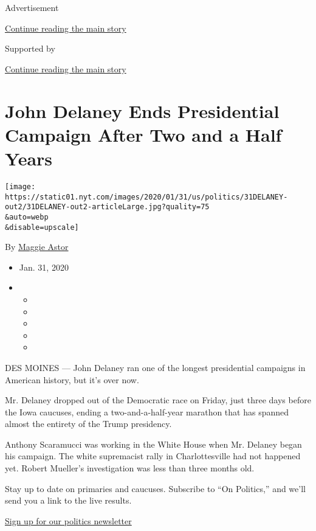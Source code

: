 Advertisement

\protect\hyperlink{after-top}{Continue reading the main story}

Supported by

\protect\hyperlink{after-sponsor}{Continue reading the main story}

\hypertarget{john-delaney-ends-presidential-campaign-after-two-and-a-half-years}{%
\section{John Delaney Ends Presidential Campaign After Two and a Half
Years}\label{john-delaney-ends-presidential-campaign-after-two-and-a-half-years}}

\texttt{[image: https://static01.nyt.com/images/2020/01/31/us/politics/31DELANEY-out2/31DELANEY-out2-articleLarge.jpg?quality=75\\\&auto=webp\\\&disable=upscale]}

By \href{https://www.nytimes.com/by/maggie-astor}{Maggie Astor}

\begin{itemize}
\item
  Jan. 31, 2020
\item
  \begin{itemize}
  \item
  \item
  \item
  \item
  \item
  \end{itemize}
\end{itemize}

DES MOINES --- John Delaney ran one of the longest presidential
campaigns in American history, but it's over now.

Mr. Delaney dropped out of the Democratic race on Friday, just three
days before the Iowa caucuses, ending a two-and-a-half-year marathon
that has spanned almost the entirety of the Trump presidency.

Anthony Scaramucci was working in the White House when Mr. Delaney began
his campaign. The white supremacist rally in Charlottesville had not
happened yet. Robert Mueller's investigation was less than three months
old.

Stay up to date on primaries and caucuses. Subscribe to ``On Politics,''
and we'll send you a link to the live results.

\href{https://www.nytimes.com/newsletters/politics}{Sign up for our
politics newsletter}

